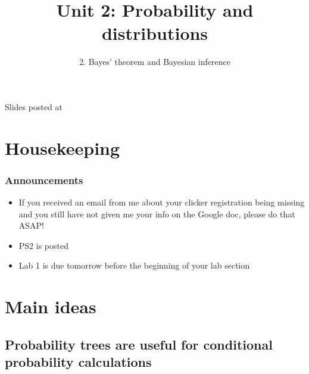 \documentclass[11pt,containsverbatim,handout,xcolor=xelatex,dvipsnames,table]{beamer}
\title{Unit 2: Probability and distributions}
\subtitle{2. Bayes' theorem and Bayesian inference}
\author{\CourseName}
\date{}
\institute{\InstituteName}
\begin{document}



\begin{frame}[plain]

\titlepage

\vfill

{\scriptsize {} \hfill Slides posted at  \webURL{\CourseSite}}

\addtocounter{framenumber}{-1} 

\end{frame}


\section{Housekeeping}


\begin{frame}
\frametitle{Announcements}

\begin{itemize}

\item If you received an email from me about your clicker registration being
missing and you still have not given me your info on the Google doc, please do that ASAP!

\item PS2 is posted

\item Lab 1 is due tomorrow before the beginning of your lab section

\end{itemize}

\end{frame}


\section{Main ideas}


\subsection{Probability trees are useful for conditional probability calculations}
\label{mi1}
\end{document}
